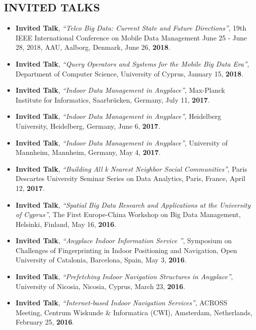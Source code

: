 \documentclass[10pt]{article}
\begin{document}
\subsection*{\bf INVITED TALKS}
\begin{itemize}
\setlength{\itemsep}{0.10ex}
\item  {\bf Invited Talk}, {\em ``Telco Big Data: Current State and Future Directions''}, 19th IEEE International Conference on Mobile Data Management June 25 - June 28, 2018, AAU, Aalborg, Denmark, June 26,  {\bf 2018}.

\item  {\bf Invited Talk}, {\em ``Query Operators and Systems for the Mobile Big Data Era''}, Department of Computer Science, University of Cyprus, January 15, {\bf 2018}.

\item  {\bf Invited Talk}, {\em ``Indoor Data Management in Anyplace''}, Max-Planck Institute for Informatics, Saarbr\"ucken, Germany, July 11, {\bf 2017}.
\item  {\bf Invited Talk}, {\em ``Indoor Data Management in Anyplace''}, Heidelberg University, Heidelberg, Germany, June 6, {\bf 2017}.
\item  {\bf Invited Talk}, {\em ``Indoor Data Management in Anyplace''}, University of Mannheim, Mannheim, Germany, May 4, {\bf 2017}.
\item  {\bf Invited Talk}, {\em ``Building All k Nearest Neighbor Social Communities''},  Paris Descartes University Seminar Series on Data Analytics, Paris, France, April 12, {\bf 2017}.

\item  {\bf Invited Talk}, {\em ``Spatial Big Data Research and Applications at the University of Cyprus''}, The First Europe-China Workshop on Big Data Management, Helsinki, Finland, May 16, {\bf 2016}.
\item  {\bf Invited Talk}, {\em ``Anyplace Indoor Information Service ''}, Symposium on Challenges of Fingerprinting in Indoor Positioning and Navigation, Open University of Catalonia, Barcelona, Spain, May 3, {\bf 2016}.
\item  {\bf Invited Talk}, {\em ``Prefetching Indoor Navigation Structures in Anyplace''}, University of Nicosia, Nicosia, Cyprus, March 23, {\bf 2016}.
\item  {\bf Invited Talk}, {\em ``Internet-based Indoor Navigation Services''}, ACROSS Meeting, Centrum Wiskunde \& Informatica (CWI), Amsterdam, Netherlands, February 25, {\bf 2016}.


\end{itemize}
\end{document}
